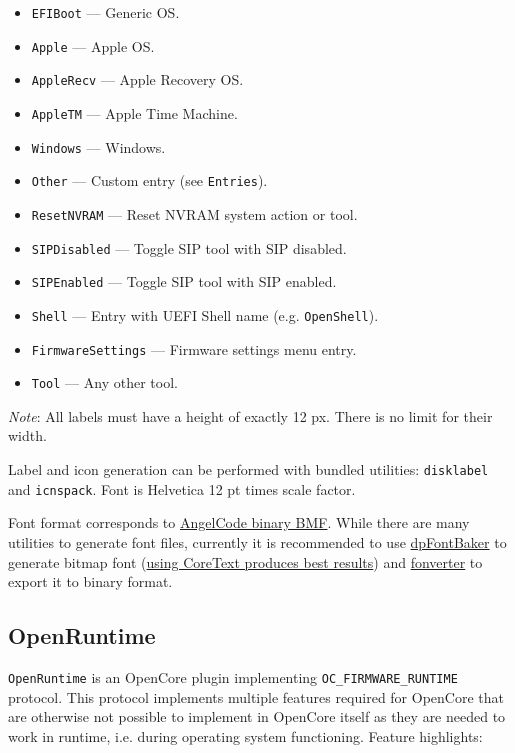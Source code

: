 \documentclass[]{article}
\providecommand{\tightlist}{%
  \setlength{\itemsep}{0pt}\setlength{\parskip}{0pt}}
\begin{document}
\begin{itemize}
\tightlist
  \item \texttt{EFIBoot} --- Generic OS.
  \item \texttt{Apple} --- Apple OS.
  \item \texttt{AppleRecv} --- Apple Recovery OS.
  \item \texttt{AppleTM} --- Apple Time Machine.
  \item \texttt{Windows} --- Windows.
  \item \texttt{Other} --- Custom entry (see \texttt{Entries}).
  \item \texttt{ResetNVRAM} --- Reset NVRAM system action or tool.
  \item \texttt{SIPDisabled} --- Toggle SIP tool with SIP disabled.
  \item \texttt{SIPEnabled} --- Toggle SIP tool with SIP enabled.
  \item \texttt{Shell} --- Entry with UEFI Shell name (e.g. \texttt{OpenShell}).
  \item \texttt{FirmwareSettings} --- Firmware settings menu entry.
  \item \texttt{Tool} --- Any other tool.
\end{itemize}

\emph{Note}: All labels must have a height of exactly 12 px. There is no limit for their width.

Label and icon generation can be performed with bundled utilities: \texttt{disklabel} and
\texttt{icnspack}. Font is Helvetica 12 pt times scale factor.

Font format corresponds to \href{https://www.angelcode.com/products/bmfont}{AngelCode binary BMF}.
While there are many utilities to generate font files, currently it is recommended to use
\href{https://github.com/danpla/dpfontbaker}{dpFontBaker} to generate bitmap font
(\href{https://github.com/danpla/dpfontbaker/pull/1}{using CoreText produces best results})
and \href{https://github.com/usr-sse2/fonverter}{fonverter} to export it to binary format.

\subsection{OpenRuntime}\label{uefiruntime}

\texttt{OpenRuntime} is an OpenCore plugin implementing \texttt{OC\_FIRMWARE\_RUNTIME} protocol.
This protocol implements multiple features required for OpenCore that are otherwise not possible
to implement in OpenCore itself as they are needed to work in runtime, i.e. during operating system
functioning. Feature highlights:
\end{document}
